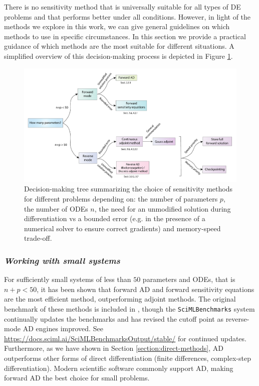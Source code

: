 
There is no sensitivity method that is universally suitable for all types of DE problems and that performs better under all conditions. 
However, in light of the methods we explore in this work, we can give general guidelines on which methods to use in specific circumstances.
In this section we provide a practical guidance of which methods are the most suitable for different situations. 
A simplified overview of this decision-making process is depicted in Figure \ref{fig:roadmap}. 

\begin{figure}[tb]
    \centering
    \includegraphics[width=1.02\textwidth]{tex/figures/roadmap.pdf}
    \caption{Decision-making tree summarizing the choice of sensitivity methods for different problems depending on: the number of parameters $p$, the number of ODEs $n$, the need for an unmodified solution during differentiation vs a bounded error (e.g. in the presence of a numerical solver to ensure correct gradients) and memory-speed trade-off.}
    \label{fig:roadmap}
\end{figure}



\subsubsection*{\textit{Working with small systems}}

For sufficiently small systems of less than $50$ parameters and ODEs, that is $n + p < 50$, it has been shown that forward AD and forward sensitivity equations are the most efficient method, outperforming adjoint methods. 
The original benchmark of these methods is included in \cite{ma2021comparison}, though the \texttt{SciMLBenchmarks} system continually updates the benchmarks and has revised the cutoff point as reverse-mode AD engines improved. 
See \url{https://docs.sciml.ai/SciMLBenchmarksOutput/stable/} for continued updates.
Furthermore, as we have shown in Section \ref{section:direct-methods}, AD outperforms other forms of direct differentiation (finite differences, complex-step differentiation). 
Modern scientific software commonly support AD, making forward AD the best choice for small problems. 

